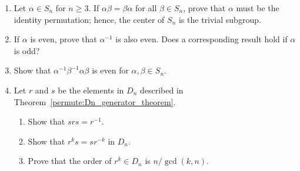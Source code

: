 {\begin{enumerate}
\begin{enumerate}
 
\item
A subgroup $H$ of $S_X$ is {\bfi
transitive} if for every $x, y \in X$, 
there exists a $\sigma \in H$ such that $\sigma(x) =y$. Prove that
$\langle \sigma \rangle$ is transitive if and only if ${\cal O}_{x,
\sigma} = X$ for some $x \in X$. 
 
 
\end{enumerate}
 
 
\item
Let $\alpha \in S_n$ for $n \geq 3$. If $\alpha \beta = \beta \alpha$
for all $\beta \in S_n$, prove that $\alpha$ must be the identity
permutation; hence, the center of $S_n$ is the trivial subgroup. 
 
 
\item
If $\alpha$ is even, prove that $\alpha^{-1}$ is also even. Does a
corresponding result hold if $\alpha$ is odd? 
 
 
\item
Show that  $\alpha^{-1} \beta^{-1} \alpha \beta$ is even for $\alpha,
\beta \in S_n$. 
 
 
\item
Let $r$ and $s$ be the elements in $D_n$ described in Theorem~\ref{permute:Dn_generator_theorem}.
\begin{enumerate}
 
 \item
Show that $srs = r^{-1}$.
 
 \item
Show that $r^k s = s r^{-k}$ in $D_n$.
 
 \item
Prove that the order of $r^k \in D_n$ is $n / \gcd(k,n)$.
  
\end{enumerate}
 
 
\end{enumerate}
}
 
 
 
 
